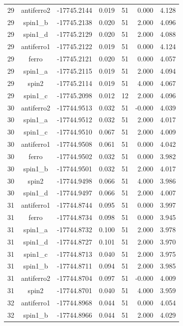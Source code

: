 \begin{longtable}{@{}ccrrrrr@{}}
\rowcolor{gray!20} 29 & antiferro2 & -17745.2144 & 0.019 & 51 & 0.000 & 4.128 \\
29 & spin1\_b & -17745.2138 & 0.020 & 51 & 2.000 & 4.096 \\
29 & spin1\_d & -17745.2129 & 0.020 & 51 & 2.000 & 4.088 \\
29 & antiferro1 & -17745.2122 & 0.019 & 51 & 0.000 & 4.124 \\
29 & ferro & -17745.2121 & 0.020 & 51 & 0.000 & 4.057 \\
29 & spin1\_a & -17745.2115 & 0.019 & 51 & 2.000 & 4.094 \\
29 & spin2 & -17745.2114 & 0.019 & 51 & 4.000 & 4.067 \\
29 & spin1\_c & -17745.2098 & 0.012 & 12 & 2.000 & 4.096 \\
\rowcolor{gray!20} 30 & antiferro2 & -17744.9513 & 0.032 & 51 & -0.000 & 4.039 \\
30 & spin1\_a & -17744.9512 & 0.032 & 51 & 2.000 & 4.017 \\
30 & spin1\_c & -17744.9510 & 0.067 & 51 & 2.000 & 4.009 \\
30 & antiferro1 & -17744.9508 & 0.061 & 51 & 0.000 & 4.042 \\
30 & ferro & -17744.9502 & 0.032 & 51 & 0.000 & 3.982 \\
30 & spin1\_b & -17744.9501 & 0.032 & 51 & 2.000 & 4.017 \\
30 & spin2 & -17744.9498 & 0.066 & 51 & 4.000 & 3.986 \\
30 & spin1\_d & -17744.9497 & 0.066 & 51 & 2.000 & 4.007 \\
\rowcolor{gray!20} 31 & antiferro1 & -17744.8744 & 0.095 & 51 & 0.000 & 3.997 \\
31 & ferro & -17744.8734 & 0.098 & 51 & 0.000 & 3.945 \\
31 & spin1\_a & -17744.8732 & 0.100 & 51 & 2.000 & 3.978 \\
31 & spin1\_d & -17744.8727 & 0.101 & 51 & 2.000 & 3.970 \\
31 & spin1\_c & -17744.8713 & 0.040 & 51 & 2.000 & 3.975 \\
31 & spin1\_b & -17744.8711 & 0.094 & 51 & 2.000 & 3.985 \\
31 & antiferro2 & -17744.8704 & 0.097 & 51 & -0.000 & 4.009 \\
31 & spin2 & -17744.8701 & 0.040 & 51 & 4.000 & 3.959 \\
\rowcolor{gray!20} 32 & antiferro1 & -17744.8968 & 0.044 & 51 & 0.000 & 4.054 \\
32 & spin1\_b & -17744.8966 & 0.044 & 51 & 2.000 & 4.029 \\

\end{longtable}
